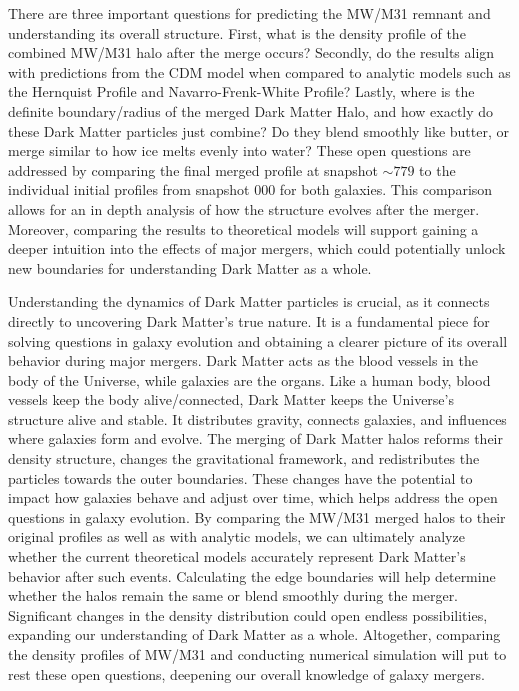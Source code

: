 \documentclass[fleqn,usenatbib]{mnras}
\begin{document}
There are three important questions for predicting the MW/M31 remnant and understanding its overall structure. First, what is the density profile of the combined MW/M31 halo after the merge occurs? Secondly, do the results align with predictions from the CDM model when compared to analytic models such as the Hernquist Profile and Navarro-Frenk-White Profile? Lastly, where is the definite boundary/radius of the merged Dark Matter Halo, and how exactly do these Dark Matter particles just combine? Do they blend smoothly like butter, or merge similar to how ice melts evenly into water? These open questions are addressed by comparing the final merged profile at snapshot $\sim 779$ to the individual initial profiles from snapshot 000 for both galaxies. This comparison allows for an in depth analysis of how the structure evolves after the merger. Moreover, comparing the results to theoretical models will support gaining a deeper intuition into the effects of major mergers, which could potentially unlock new boundaries for understanding Dark Matter as a whole. 

Understanding the dynamics of Dark Matter particles is crucial, as it connects directly to uncovering Dark Matter's true nature. It is a fundamental piece for solving questions in galaxy evolution and obtaining a clearer picture of its overall behavior during major mergers. Dark Matter acts as the blood vessels in the body of the Universe, while galaxies are the organs. Like a human body, blood vessels keep the body alive/connected, Dark Matter keeps the Universe's structure alive and stable. It distributes gravity, connects galaxies, and influences where galaxies form and evolve. The merging of Dark Matter halos reforms their density structure, changes the gravitational framework, and redistributes the particles towards the outer boundaries. These changes have the potential to impact how galaxies behave and adjust over time, which helps address the open questions in galaxy evolution. By comparing the MW/M31 merged halos to their original profiles as well as with analytic models, we can ultimately analyze whether the current theoretical models accurately represent Dark Matter's behavior after such events. Calculating the edge boundaries will help determine whether the halos remain the same or blend smoothly during the merger. Significant changes in the density distribution could open endless possibilities, expanding our understanding of Dark Matter as a whole. Altogether, comparing the density profiles of MW/M31 and conducting numerical simulation will put to rest these open questions, deepening our overall knowledge of galaxy mergers.
\end{document}
